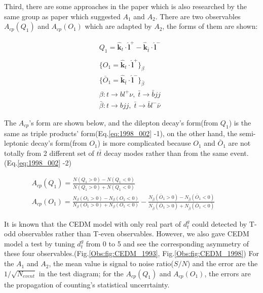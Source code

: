 
			Third, there are some approaches in the paper \cite{Bernreuther:1998qv} which is also researched by the same group as paper\cite{Bernreuther:1993hq} which suggested $A_1$ and $A_2$. There are two observables $A_{cp}(Q_1)$ and $A_{cp}(O_1)$ which are adapted by $A_2$, the forms of them are shown:

			\begin{equation}
			\begin{split} 
			Q_1 = \hat{\textbf{k}}_t \cdot \hat{\textbf{l}}^+ - \hat{\textbf{k}}_{\bar{t}} \cdot \hat{\textbf{l}}^- \;\\
			 \\
			\{ O_1 = \hat{\textbf{k}}_t \cdot \hat{\textbf{l}}^+ \}_{\beta} \;\;\;\;\;\;\;\;\;\;\\
			\{\bar{O}_1 = \hat{\textbf{k}}_{\bar{t}} \cdot \hat{\textbf{l}}^- \}_{\bar{\beta}} \;\;\;\;\;\;\;\;\;\;\\
			\beta : t\rightarrow bl^+\nu,\; \bar{t}\rightarrow \bar{b}jj \\
			\bar{\beta} : t\rightarrow bjj,\; \bar{t}\rightarrow \bar{b} l^- \bar{\nu} 
			\end{split}
			\label{eq:1998_001}
			\end{equation}

			The $A_{cp}$'s form are shown below, and the dilepton decay's form(from $Q_1$) is the same as triple products' form(Eq.\ref{eq:1998_002} -1), on the other hand, the semi-leptonic decay's form(from $O_1$) is more complicated because $O_1$ and $\bar{O}_1$ are not totally from 2 different set of $t\bar{t}$ decay modes rather than from the same event.(Eq.\ref{eq:1998_002} -2)

			\begin{equation}
			\begin{split} 
			A_{cp}(Q_1) = \frac{ N(Q_1 > 0) - N(Q_1 < 0) }{N(Q_1 > 0) + N(Q_1 < 0) } \;\;\;\;\;\;\;\;\;\;\;\;\;\;\;\;\;\;\;\;\;\;\;\;\;\;\;\;\;\;\;\;\;\;\;\;\;\;\;\;\;\;\;\;\;\;\;\;\;\\
			A_{cp}(O_1) = \frac{ N_{\beta}(O_1 > 0) - N_{\beta}(O_1 < 0) }{N_{\beta}(O_1 > 0) + N_{\beta}(O_1 < 0) } - \frac{ N_{\bar{\beta}}(\bar{O}_1 > 0) - N_{\bar{\beta}}(\bar{O}_1 < 0) }{N_{\bar{\beta}}(\bar{O}_1 > 0) + N_{\bar{\beta}}(\bar{O}_1 < 0) } 
			\end{split}
			\label{eq:1998_002}
			\end{equation}


			It is known that the CEDM model with only real part of $d_t^g$ could detected by T-odd observables rather than T-even observables. However, we also gave CEDM model a test by tuning $d_t^g$ from 0 to 5 and see the corresponding asymmetry of these four observables.(Fig.\ref{Obs:fig:CEDM_1993}, Fig.\ref{Obs:fig:CEDM_1998}) For the $A_1$ and $A_2$, the mean value is signal to noise ratio($S/N$) and the error are the $1/\sqrt{N_{event}}$ in the test diagram; for the $A_{cp}(Q_1)$ and $A_{cp}(O_1)$, the errors are the propagation of counting's statistical uncerrtainty.

